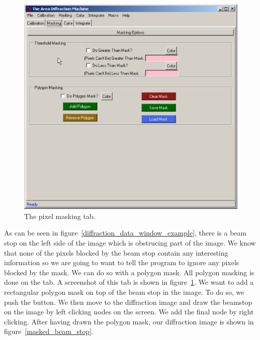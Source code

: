 \begin{figure}
    \centering
    \includegraphics[scale=.75]{figures/masking_tab.eps}
    \caption{The pixel masking tab.}
    \label{masking_tab_example}
\end{figure}

As can be seen in figure~\ref{diffraction_data_window_example},
there is a beam stop on the left side of the image which is
obstrucing part of the image. We know that none of the pixels
blocked by the beam stop contain any interesting information
so we are going to want to tell the program to ignore any pixels
blocked by the mask. We can do so with a polygon mask. All
polygon masking is done on the  tab. A screenshot
of this tab is shown in figure~\ref{masking_tab_example}.
We want to add a rectangular polygon mask on top of the beam
stop in the image. To do so, we push the  button.
We then move to the diffraction image and draw the beamstop
on the image by left clicking nodes on the screen. We add the
final node by right clicking. After having drawn the polygon mask, 
our diffraction image is shown in figure~\ref{masked_beam_stop}.

